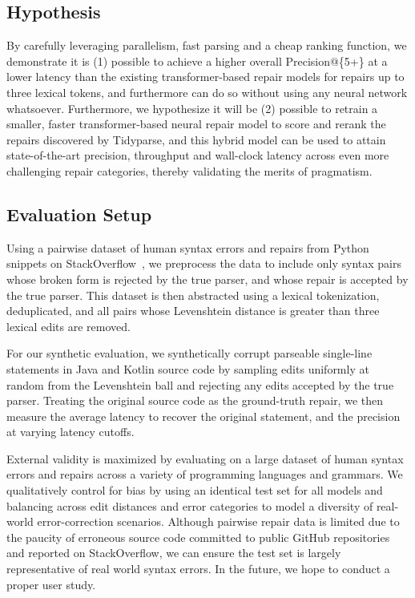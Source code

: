\documentclass[sigplan,screen]{acmart}
\begin{document}
\subsection{Hypothesis}


By carefully leveraging parallelism, fast parsing and a cheap ranking function, we demonstrate it is (1) possible to achieve a higher overall Precision@\{5+\} at a lower latency than the existing transformer-based repair models for repairs up to three lexical tokens, and furthermore can do so without using any neural network whatsoever. Furthermore, we hypothesize it will be (2) possible to retrain a smaller, faster transformer-based neural repair model to score and rerank the repairs discovered by Tidyparse, and this hybrid model can be used to attain state-of-the-art precision, throughput and wall-clock latency across even more challenging repair categories, thereby validating the merits of pragmatism.

\subsection{Evaluation Setup}


Using a pairwise dataset of human syntax errors and repairs from Python snippets on StackOverflow~\cite{wong2019syntax}, we preprocess the data to include only syntax pairs whose broken form is rejected by the true parser, and whose repair is accepted by the true parser. This dataset is then abstracted using a lexical tokenization, deduplicated, and all pairs whose Levenshtein distance is greater than three lexical edits are removed.

For our synthetic evaluation, we synthetically corrupt parseable single-line statements in Java and Kotlin source code by sampling edits uniformly at random from the Levenshtein ball and rejecting any edits accepted by the true parser. Treating the original source code as the ground-truth repair, we then measure the average latency to recover the original statement, and the precision at varying latency cutoffs.

External validity is maximized by evaluating on a large dataset of human syntax errors and repairs across a variety of programming languages and grammars. We qualitatively control for bias by using an identical test set for all models and balancing across edit distances and error categories to model a diversity of real-world error-correction scenarios. Although pairwise repair data is limited due to the paucity of erroneous source code committed to public GitHub repositories and reported on StackOverflow, we can ensure the test set is largely representative of real world syntax errors. In the future, we hope to conduct a proper user study.



\end{document}
